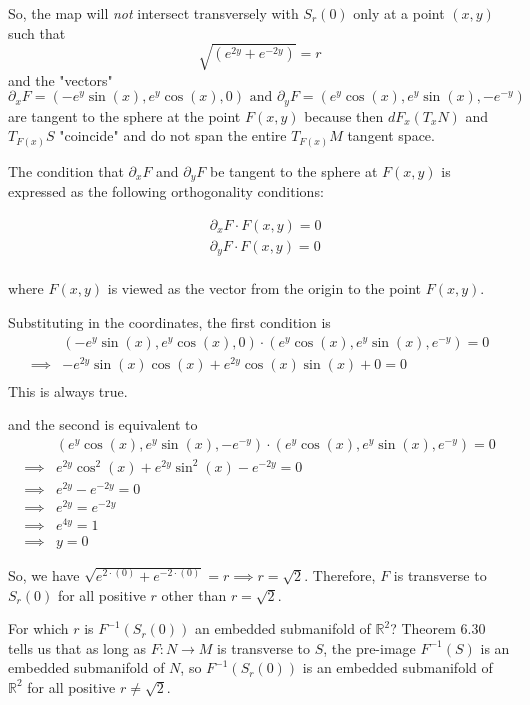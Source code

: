 \documentclass{article}
\newcommand{\R}{\mathbb{R}}
\begin{document}
\vskip 0.5cm
So, the map will \emph{not} intersect transversely with $S_r(0)$ only at a point $(x,y)$ such that 
\[ \sqrt{\left(e^{2y} + e^{-2y}\right)} = r \] 
and the "vectors" 
\[ \partial_x F = \left(-e^y \sin(x), e^y \cos(x), 0\right) \text{    and    } \partial_y F = \left(e^y \cos(x), e^y\sin(x), -e^{-y}\right)   \]
are tangent to the sphere at the point $F(x,y)$ because then $dF_x(T_xN)$ and $T_{F(x)}S$ "coincide" and do not span the entire $T_{F(x)}M$ tangent space.

\vskip 0.5cm
The condition that $\partial_x F$ and $\partial_y F$ be tangent to the sphere at $F(x,y)$ is expressed as the following orthogonality conditions:

\begin{align*}
  &\partial_x F \cdot F(x,y) = 0 \\
  &\partial_y F \cdot F(x,y) = 0 \\
\end{align*}

where $F(x,y)$ is viewed as the vector from the origin to the point $F(x,y)$.

\vskip 0.5cm
Substituting in the coordinates, the first condition is 
\begin{align*}
  &\left(-e^y \sin(x), e^y \cos(x), 0\right) \cdot \left(e^y \cos(x), e^y \sin(x), e^{-y}\right) = 0 \\
  \implies & -e^{2y} \sin(x)\cos(x) + e^{2y}\cos(x)\sin(x) + 0= 0\\
\end{align*}
This is always true.

\vskip 0.5cm

and the second is equivalent to 
\begin{align*}
  &\left(e^y \cos(x), e^y\sin(x), -e^{-y}\right) \cdot \left(e^y \cos(x), e^y \sin(x), e^{-y}\right) = 0 \\
  \implies &e^{2y}\cos^2(x) + e^{2y}\sin^2(x) - e^{-2y} = 0 \\
  \implies &e^{2y} - e^{-2y} = 0 \\
  \implies &e^{2y} = e^{-2y} \\
  \implies &e^{4y} = 1 \\
  \implies &y = 0
\end{align*}

\vskip 0.5cm
So, we have $\sqrt{e^{2\cdot(0)} + e^{-2\cdot(0)}} = r \implies r = \sqrt{2}$. Therefore, $F$ is transverse to $S_r(0)$ for all positive $r$ other than $r = \sqrt{2}$.

\vskip 0.5cm
For which $r$ is $F^{-1}\left(S_r(0)\right)$ an embedded submanifold of $\R^2$? Theorem 6.30 tells us that as long as $F : N \rightarrow M$ is transverse to $S$, the pre-image $F^{-1}\left(S\right)$ is an embedded submanifold of $N$, so $F^{-1}\left(S_r(0)\right)$ is an embedded submanifold of $\R^2$ for all positive $r \neq \sqrt{2}$.
\end{document}
